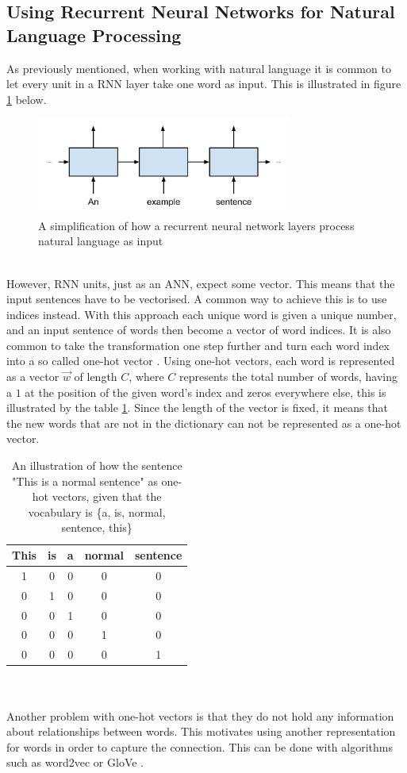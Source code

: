 \subsection{Using Recurrent Neural Networks for Natural Language Processing}\label{sec:rnn_nlp}
As previously mentioned, when working with natural language it is common to let every unit in a RNN layer take one word as input. This is illustrated in figure \ref{fig:sentence_to_rnn} below.
\begin{figure}[h]
    \centering
    \includegraphics[width=0.75\textwidth]{figure/ann/sentence_to_rnn}
    \caption{A simplification of how a recurrent neural network layers process natural language as input}
    \label{fig:sentence_to_rnn}
\end{figure}
\\
However, RNN units, just as an ANN, expect some vector. This means that the input sentences have to be vectorised. A common way to achieve this is to use indices instead. With this approach each unique word is given a unique number, and an input sentence of words then become a vector of word indices. It is also common to take the transformation one step further and turn each word index into a so called one-hot vector \parencite{turian2010word}. Using one-hot vectors, each word is represented as a vector $\vec{w}$ of length $C$, where $C$ represents the total number of words, having a $1$ at the position of the given word's index and zeros everywhere else, this is illustrated by the table \ref{tab:onehot}. Since the length of the vector is fixed, it means that the new words that are not in the dictionary can not be represented as a one-hot vector. 
\begin{table}[h]
    \centering
    \begin{tabular}{c|c|c|c|c}
    This & is & a & normal & sentence\\
    \hline
    1 & 0 & 0 & 0 & 0\\
    0 & 1 & 0 & 0 & 0\\
    0 & 0 & 1 & 0 & 0\\
    0 & 0 & 0 & 1 & 0\\
    0 & 0 & 0 & 0 & 1
    \end{tabular}
    \caption{An illustration of how the sentence "This is a normal sentence" as one-hot vectors, given that the vocabulary is \{a, is, normal, sentence, this\}}
    \label{tab:onehot}
\end{table} 
\\\\
Another problem with one-hot vectors is that they do not hold any information about relationships between words. This motivates using another representation for words in order to capture the connection. This can be done with algorithms such as word2vec \parencite{mikolov2013linguistic} or GloVe \parencite{pennington2014glove}. 
